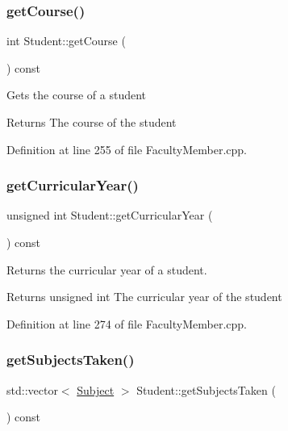 \subsubsection{\texorpdfstring{get\+Course()}{getCourse()}}
{\footnotesize\ttfamily int Student\+::get\+Course (\begin{DoxyParamCaption}{ }\end{DoxyParamCaption}) const}

Gets the course of a student \begin{DoxyReturn}{Returns}
The course of the student 
\end{DoxyReturn}


Definition at line 255 of file Faculty\+Member.\+cpp.

\mbox{\label{classStudent_a40e4932da73265df93cf942d162c41b3}} 
\subsubsection{\texorpdfstring{get\+Curricular\+Year()}{getCurricularYear()}}
{\footnotesize\ttfamily unsigned int Student\+::get\+Curricular\+Year (\begin{DoxyParamCaption}{ }\end{DoxyParamCaption}) const}



Returns the curricular year of a student. 

\begin{DoxyReturn}{Returns}
unsigned int The curricular year of the student 
\end{DoxyReturn}


Definition at line 274 of file Faculty\+Member.\+cpp.

\mbox{\label{classStudent_a5db626d71418122132a534983d2a9c06}} 
\subsubsection{\texorpdfstring{get\+Subjects\+Taken()}{getSubjectsTaken()}}
{\footnotesize\ttfamily std\+::vector$<$ \hyperlink{classSubject}{Subject} $>$ Student\+::get\+Subjects\+Taken (\begin{DoxyParamCaption}{ }\end{DoxyParamCaption}) const}

